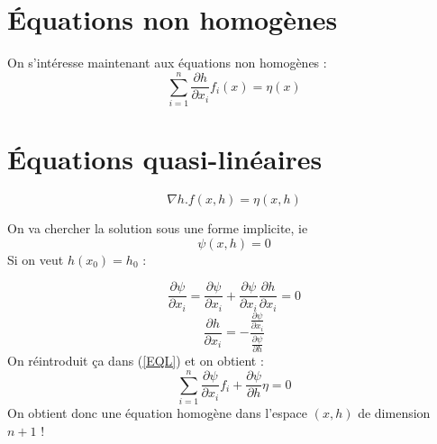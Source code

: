 \section{Équations non homogènes}
On s'intéresse maintenant aux équations non homogènes : \begin{equation} \label{ENH}\tag{ENH} \sum_{i=1}^n \frac{\partial h}{\partial x_i} f_i(x)=\eta(x) \end{equation}

\section{Équations quasi-linéaires}
\begin{equation} \tag{EQL} \label{EQL} \nabla h . f(x,h)=\eta(x,h) \end{equation}

On va chercher la solution sous une forme implicite, ie \begin{equation} \tag{Impl} \label{Impl} \psi(x,h)=0\end{equation}
Si on veut $h(x_0)=h_0$ :

\[\frac{\partial \psi}{\partial x_i}=\frac{\partial \psi}{\partial x_i} + \frac{\partial \psi}{\partial x_i} \frac{\partial h}{\partial x_i} = 0\]
\[\frac{\partial h}{\partial x_i} = -\frac{\frac{\partial \psi}{\partial x_i}}{\frac{\partial \psi}{\partial h}}\]
On réintroduit ça dans (\ref{EQL}) et on obtient :
\begin{equation} \tag{EHIm} \label{EHIm} \sum_{i=1}^n \frac{\partial \psi}{\partial x_i} f_i + \frac{\partial \psi}{\partial h} \eta = 0 \end{equation}
On obtient donc une équation homogène dans l'espace $(x,h)$ de dimension $n+1$ !

